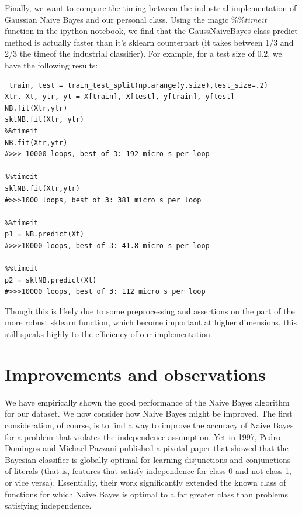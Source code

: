 \documentclass[12pt]{article}
\begin{document}
 Finally, we want to compare the timing between the industrial implementation of Gaussian Naive Bayes and our personal class. 
 Using the magic $\%\% timeit$ function in the ipython notebook, we find that the GaussNaiveBayes class predict method is actually faster than it's sklearn counterpart (it takes between 1/3 and 2/3 the timeof the industrial classifier).
 For example, for a test size of $0.2$, we have the following results:
\begin{lstlisting}
 train, test = train_test_split(np.arange(y.size),test_size=.2)
Xtr, Xt, ytr, yt = X[train], X[test], y[train], y[test]
NB.fit(Xtr,ytr)
sklNB.fit(Xtr, ytr)
%%timeit
NB.fit(Xtr,ytr)
#>>> 10000 loops, best of 3: 192 micro s per loop

%%timeit
sklNB.fit(Xtr,ytr)
#>>>1000 loops, best of 3: 381 micro s per loop

%%timeit
p1 = NB.predict(Xt)
#>>>10000 loops, best of 3: 41.8 micro s per loop

%%timeit
p2 = sklNB.predict(Xt)
#>>>10000 loops, best of 3: 112 micro s per loop
 \end{lstlisting}
 Though this is likely due to some preprocessing and assertions on the part of the more robust sklearn function, which become important at higher dimensions, this still speaks highly to the efficiency of our implementation. 
 
 \section*{Improvements and observations}
We have empirically shown the good performance of the Naive Bayes algorithm for our dataset.
We now consider how Naive Bayes might be improved.
The first consideration, of course, is to find a way to improve the accuracy of Naive Bayes for a problem that violates the independence assumption.
Yet in 1997, Pedro Domingos and Michael Pazzani published a pivotal paper that showed that the Bayesian classifier is globally optimal for learning disjunctions and conjunctions of literals (that is, features that satisfy independence for class 0 and not class 1, or vice versa)\cite{Domingos1997}. 
Essentially, their work significantly extended the known class of functions for which Naive Bayes is optimal to a far greater class than problems satisfying independence.
\end{document}
